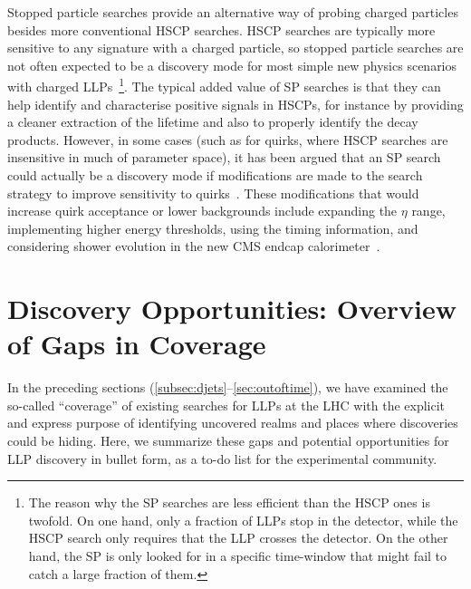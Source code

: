 Stopped particle searches provide an alternative way of probing charged particles besides more conventional HSCP searches. HSCP searches are typically more sensitive to any signature with a charged particle, so stopped particle searches are not often expected to be a discovery mode for most simple new physics scenarios with charged LLPs~\footnote{The reason why the SP searches are less efficient than the HSCP ones is twofold. On one hand, only a fraction of LLPs stop in the detector, while the HSCP search only requires that the LLP crosses the detector. On the other hand, the SP is only looked for in a specific time-window that might fail to catch a large fraction of them.}. The typical added value of SP searches is that they can help identify and characterise positive signals in HSCPs, for instance by providing a cleaner extraction of the lifetime and also to properly identify the decay products. However, in some cases (such as for quirks, where HSCP searches are insensitive in much of parameter space), it has been argued that an SP search could actually be a discovery mode if modifications are made to the search strategy to improve sensitivity to quirks~\cite{Evans:2018jmd}.  These modifications that would increase quirk acceptance or lower backgrounds include expanding the $\eta$ range, implementing higher energy thresholds, using the timing information, and considering shower evolution in the new CMS endcap calorimeter~\cite{Collaboration:2293646}.


\section{Discovery Opportunities: Overview of Gaps in Coverage}
\label{sec:covgaps}

In the preceding sections (\ref{subsec:djets}--\ref{sec:outoftime}), we have examined the so-called ``coverage'' of existing searches for LLPs at the LHC with the explicit and express purpose of identifying uncovered realms and places where discoveries could be hiding. Here, we summarize these gaps and potential opportunities for LLP discovery in bullet form, as a to-do list for the experimental community.

